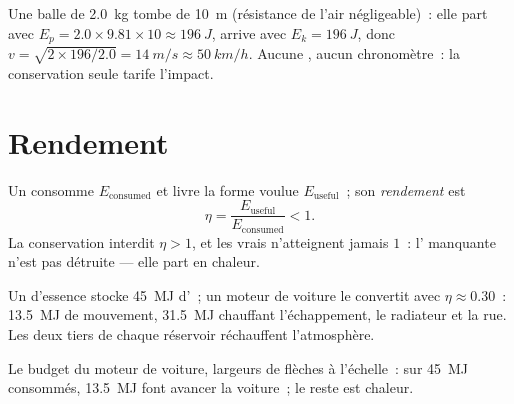 \begin{example}\label{ex:g10:energy-conservation:fall}
Une balle de \qty{2.0}{kg} tombe de \qty{10}{m} (résistance de l'air
négligeable)~: elle part avec
$E_p = 2.0 \times 9.81 \times 10 \approx \qty{196}{J}$, arrive avec
$E_k = \qty{196}{J}$, donc $v = \sqrt{2 \times 196/2.0} =
\qty{14}{m/s} \approx \qty{50}{km/h}$. Aucune ,
aucun chronomètre~: la conservation seule tarife l'impact.
\end{example}

\section{Rendement}

\begin{definition}[Rendement]\label{def:g10:energy-conservation:efficiency}
Un  consomme $E_{\text{consumed}}$ et livre
la forme voulue $E_{\text{useful}}$~; son
\emph{rendement} est
\[
\eta = \frac{E_{\text{useful}}}{E_{\text{consumed}}} < 1 .
\]
La conservation interdit $\eta > 1$, et les vrais
 n'atteignent jamais $1$~: l'
manquante n'est pas détruite --- elle part en chaleur.
\end{definition}

\begin{example}[Où va l'essence]\label{ex:g10:energy-conservation:engine}
Un  d'essence stocke \qty{45}{MJ}
d'~; un moteur de voiture le convertit avec
$\eta \approx 0.30$~: \qty{13.5}{MJ} de mouvement, \qty{31.5}{MJ}
chauffant l'échappement, le radiateur et la rue. Les deux tiers de
chaque réservoir réchauffent l'atmosphère.
\end{example}

\begin{omfigure}

{\small Le budget du moteur de voiture, largeurs de flèches à l'échelle~:
sur \qty{45}{MJ} consommés, \qty{13.5}{MJ} font avancer la voiture~; le
reste est chaleur.}
\end{omfigure}

